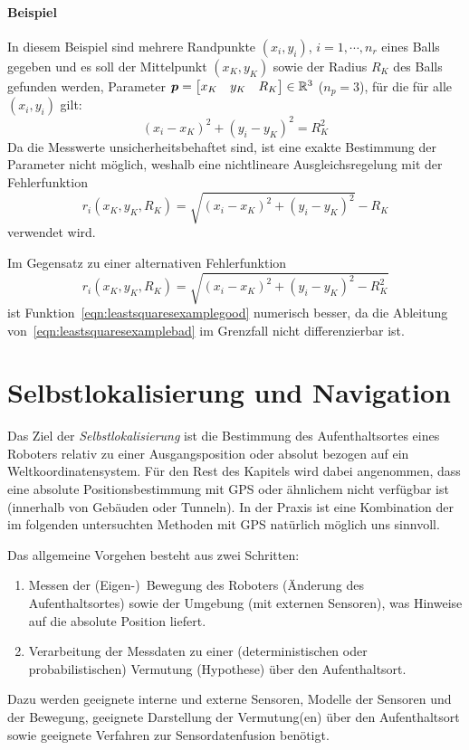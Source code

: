 			\paragraph{Beispiel}
				In diesem Beispiel sind mehrere Randpunkte \( (x_i, y_i) \), \( i = 1, \cdots, n_r \) eines Balls gegeben und es soll der Mittelpunkt \( (x_K, y_K) \) sowie der Radius \( R_K \) des Balls gefunden werden, \dh Parameter \( \bm{p} = \begin{bmatrix} x_K & y_K & R_K \end{bmatrix} \in \mathbb{R}^3 \) (\( n_p = 3 \)), für die für alle \( (x_i, y_i) \) gilt:
				\begin{equation*}
					(x_i - x_K)^2 + (y_i - y_K)^2 = R_K^2 \tag{Kreisgleichung}
				\end{equation*}
				Da die Messwerte unsicherheitsbehaftet sind, ist eine exakte Bestimmung der Parameter nicht möglich, weshalb eine nichtlineare Ausgleichsregelung mit der Fehlerfunktion
				\begin{equation}
					r_i(x_K, y_K, R_K) = \sqrt{(x_i - x_K)^2 + (y_i - y_K)^2} - R_K \label{eqn:leastsquaresexamplegood}
				\end{equation}
				verwendet wird.

				Im Gegensatz zu einer alternativen Fehlerfunktion
				\begin{equation}
					r_i(x_K, y_K, R_K) = \sqrt{(x_i - x_K)^2 + (y_i - y_K)^2 - R_K^2} \label{eqn:leastsquaresexamplebad}
				\end{equation}
				ist Funktion~\ref{eqn:leastsquaresexamplegood} numerisch besser, da die Ableitung von~\ref{eqn:leastsquaresexamplebad} im Grenzfall nicht differenzierbar ist.

	\section{Selbstlokalisierung und Navigation}
		Das Ziel der \emph{Selbstlokalisierung} ist die Bestimmung des Aufenthaltsortes eines Roboters relativ zu einer Ausgangsposition oder absolut bezogen auf ein Weltkoordinatensystem. Für den Rest des Kapitels wird dabei angenommen, dass eine absolute Positionsbestimmung mit GPS oder ähnlichem nicht verfügbar ist (\zB innerhalb von Gebäuden oder Tunneln). In der Praxis ist eine Kombination der im folgenden untersuchten Methoden mit GPS natürlich möglich uns sinnvoll.

		Das allgemeine Vorgehen besteht aus zwei Schritten:
		\begin{enumerate}
			\item Messen der (Eigen-)~Bewegung des Roboters (Änderung des Aufenthaltsortes) sowie der Umgebung (mit externen Sensoren), was Hinweise auf die absolute Position liefert.
			\item Verarbeitung der Messdaten zu einer (deterministischen oder probabilistischen) Vermutung (Hypothese) über den Aufenthaltsort.
		\end{enumerate}
		Dazu werden geeignete interne und externe Sensoren, Modelle der Sensoren und der Bewegung, geeignete Darstellung der Vermutung(en) über den Aufenthaltsort sowie geeignete Verfahren zur Sensordatenfusion benötigt.

